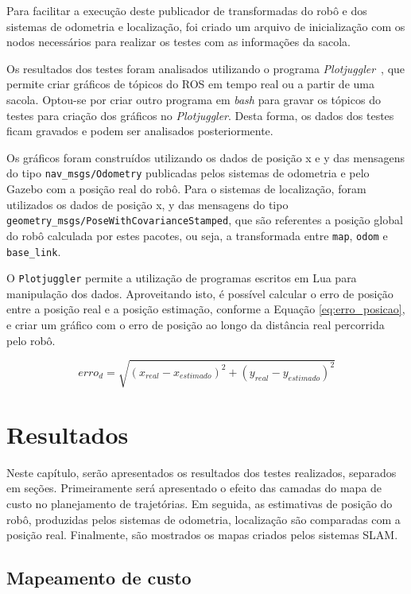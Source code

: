 \documentclass[repeatfields,xlists,xpacks,oneside,yearsonly]{ufrgscca}
\begin{document}
Para facilitar a execução deste publicador de transformadas do robô e
dos sistemas de odometria e localização, foi criado um arquivo de
inicialização com os nodos necessários para realizar os testes com as
informações da sacola.

Os resultados dos testes foram analisados utilizando o programa
\textit{Plotjuggler}~\cite{plotjuggler}, que permite criar gráficos
de tópicos do ROS em tempo real ou a partir de uma sacola. Optou-se
por criar outro programa em \textit{bash} para gravar os tópicos do
testes para criação dos gráficos no \textit{Plotjuggler}. Desta
forma, os dados dos testes ficam gravados e podem ser analisados
posteriormente.

Os gráficos foram construídos utilizando os dados de posição x e y
das mensagens do tipo \texttt{nav\_msgs/Odometry} publicadas pelos
sistemas de odometria e pelo Gazebo com a posição real do robô. Para
o sistemas de localização, foram utilizados os dados de posição x, y
das mensagens do tipo
\texttt{geometry\_msgs/PoseWithCovarianceStamped}, que são referentes
a posição global do robô calculada por estes pacotes, ou seja, a
transformada entre \texttt{map}, \texttt{odom} e \texttt{base\_link}.

O \texttt{Plotjuggler} permite a utilização de programas escritos em
Lua para manipulação dos dados. Aproveitando isto, é possível
calcular o erro de posição entre a posição real e a posição
estimação, conforme a Equação \ref{eq:erro_posicao}, e criar um
gráfico com o erro de posição ao longo da distância real percorrida
pelo robô.

\begin{equation}
    \label{eq:erro_posicao}
    erro_d = \sqrt{(x_{real} - x_{estimado})^2 + (y_{real} - y_{estimado})^2}
\end{equation}

\chapter{Resultados}
\label{resultados}

Neste capítulo, serão apresentados os resultados dos testes
realizados, separados em seções. Primeiramente será apresentado o
efeito das camadas do mapa de custo no planejamento de trajetórias.
Em seguida, as estimativas de posição do robô, produzidas pelos
sistemas de odometria, localização são comparadas com a posição real.
Finalmente, são mostrados os mapas criados pelos sistemas SLAM.

\section{Mapeamento de custo}
\end{document}
